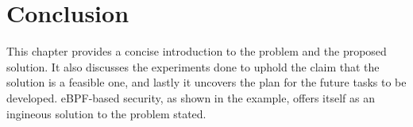 \section{Conclusion}
This chapter provides a concise introduction to the problem and the proposed solution. It also discusses the experiments done to uphold the claim that the solution is a feasible one, and lastly it uncovers the plan for the future tasks to be developed. 
eBPF-based security, as shown in the example, offers itself as an ingineous solution to the problem stated.

\begin{comment}
In addition to these tasks, we may consider incorporating additional features or making improvements to existing features, depending on the results of our research and the progress of our work. The aim is to continue advancing the state of the art in the field of blockchain consensus algorithms, and to provide a comprehensive understanding of the various protocols and tools that are available for improving the performance and efficiency of blockchain networks.


\section{Conclusion}

In conclusion, this project has explored the crucial concepts of in the field of blockchain technology. Through a review of the state of the art, it was revealed that there are several popular consensus algorithms used in blockchain networks, each with its own strengths and weaknesses. The project then identified the challenges in the field of consensus protocols, including the lack of standardization, difficulties in comparison, testing and the fact that there's a multitude of different consensus algorithms available in the field of blockchain technology,
making it difficult for individuals and organizations to adopt blockchain effectively.

The proposed solution was to overcome these challenges by providing a method of testing and easily swapping consensus algorithms in a pre-existing well-tested blockchain network.
The implementation of this solution was tested and proved to be feasible by the execution of the experiment done, demonstrating the versatility and flexibility of the Tezos network in accommodating custom consensus protocols.

The document also outlined the main contributions, goals, and objectives for future work.
The next phase of the project will focus on the completion and testing of the Proof of Work (experiment) protocol implemented in Tezos, development of a generic framework for adding new consensus algorithms, creation of a platform for testing them, integration with the Lupin DSL, and writing of the thesis to present research results and conclusions on the work performed. The aim is to advance the state of the art in blockchain consensus algorithms and provide a comprehensive understanding of available protocols and tools to improve block\-chain network performance and efficiency.





\end{comment}
